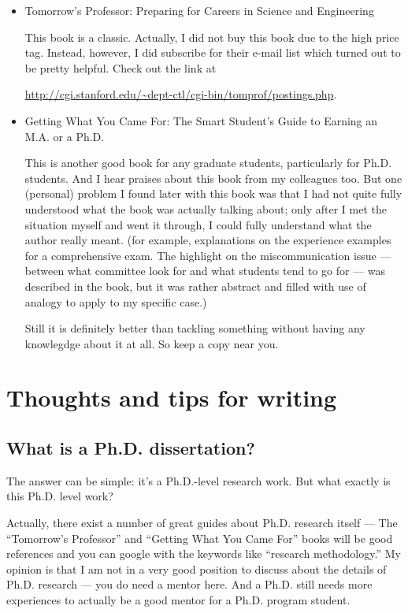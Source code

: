 \documentclass[11pt]{article}
\begin{document}
\begin{itemize}
    \item Tomorrow's Professor: Preparing for Careers in Science and
        Engineering

        This book is a classic. Actually, I did not buy this book due to
        the high price tag. Instead, however, I did subscribe for
        their e-mail list which turned out to be pretty helpful.  Check out the
        link at
        \begin{small}\url{http://cgi.stanford.edu/\~dept-ctl/cgi-bin/tomprof/postings.php}.\end{small}

    \item Getting What You Came For: The Smart Student's Guide to Earning an
        M.A. or a Ph.D.

        This is another good book for any graduate students, particularly for
        Ph.D. students. And I hear praises about this book from my colleagues
        too. But one (personal) problem I found later with this book was that
        I had not quite fully understood what the book was actually talking
        about; only after I met the situation myself and went it through, I
        could fully understand what the author really meant. (for example,
        explanations on the experience examples for a comprehensive exam. The
        highlight on the miscommunication issue --- between what committee
        look for and what students tend to go for --- was described in the
        book, but it was rather abstract and filled with use of analogy to 
        apply to my specific case.)

        Still it is definitely better than tackling something without
        having any knowlegdge about it at all. So keep a copy near you.

\end{itemize}


\section{Thoughts and tips for writing}

\subsection{What is a Ph.D. dissertation?}
The answer can be simple: it's a Ph.D.-level research work. But what exactly is
this Ph.D. level work? 

Actually, there exist a number of great guides about Ph.D. research itself --- 
The ``Tomorrow's Professor'' and ``Getting What You Came For'' books will be
good references and you can google with the keywords like ``research
methodology.'' My opinion is that I am not in a very good position to discuss
about the details of Ph.D. research --- you do need a mentor here. And a Ph.D.
still needs more experiences to actually be a good mentor for a Ph.D. program
student.
\end{document}
